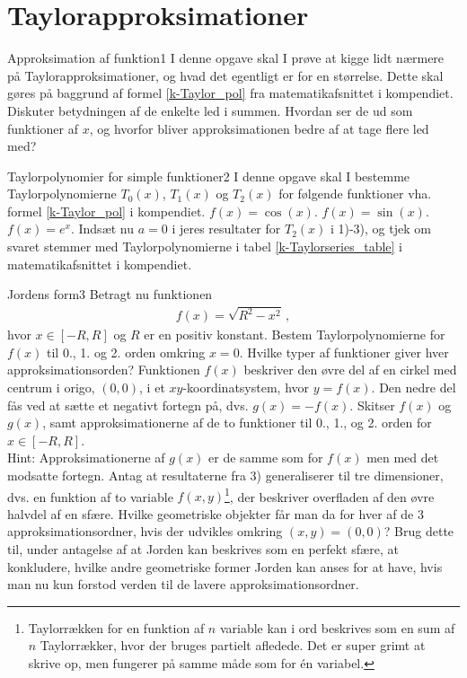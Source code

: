 \section*{Taylorapproksimationer}
\begin{opgave}{Approksimation af funktion}{1}
	I denne opgave skal I prøve at kigge lidt nærmere på Taylorapproksimationer, og hvad det egentligt er for en størrelse. Dette skal gøres på baggrund af formel \eqref{k-Taylor_pol} fra matematikafsnittet i kompendiet.
	\opg Diskuter betydningen af de enkelte led i summen. Hvordan ser de
	ud som funktioner af $x$, og hvorfor bliver approksimationen bedre
	af at tage flere led med?
\end{opgave}	
\begin{opgave}{Taylorpolynomier for simple funktioner}{2}
I denne opgave skal I bestemme Taylorpolynomierne $T_0(x)$, $T_1(x)$ og $T_2(x)$ for følgende funktioner vha. formel \eqref{k-Taylor_pol} i kompendiet.
\opg $f(x) = \cos(x)$.
\opg $f(x) = \sin(x)$.
\opg $f(x) = e^x$.
\opg Indsæt nu $a=0$ i jeres resultater for $T_2(x)$ i 1)-3), og tjek om svaret stemmer med Taylorpolynomierne i tabel \ref{k-Taylorseries_table} i matematikafsnittet i kompendiet. 
\end{opgave}
\begin{opgave}{Jordens form}{3}
Betragt nu funktionen
\begin{align*}
f(x) = \sqrt{R^2 - x^2} \, ,
\end{align*}
hvor $ x \in [-R,R]$ og $R$ er en positiv konstant.
\opg Bestem Taylorpolynomierne for $f(x)$ til 0., 1. og 2. orden omkring $x=0$.
\opg Hvilke typer af funktioner giver hver approksimationsorden?
\opg Funktionen $f(x)$ beskriver den øvre del af en cirkel med centrum i origo, $(0,0)$, i et $xy$-koordinatsystem, hvor $y = f(x)$. Den nedre del fås ved at sætte et negativt fortegn på, dvs. $g(x) = -f(x)$. Skitser $f(x)$ og $g(x)$, samt approksimationerne af de to funktioner til 0., 1., og 2. orden for $x \in [-R,R]$.\\
Hint: Approksimationerne af $g(x)$ er de samme som for $f(x)$ men med det modsatte fortegn. 
\opg Antag at resultaterne fra 3) generaliserer til tre dimensioner, dvs. en funktion af to variable $f(x,y)$\footnote{Taylorrækken for en funktion af $n$ variable kan i ord beskrives som en sum af $n$ Taylorrækker, hvor der bruges partielt afledede. Det er super grimt at skrive op, men fungerer på samme måde som for én variabel.}, der beskriver overfladen af den øvre halvdel af en sfære. Hvilke geometriske objekter får man da for hver af de 3 approksimationsordner, hvis der udvikles omkring $(x,y)=(0,0)$?
\opg Brug dette til, under antagelse af at Jorden kan beskrives som en perfekt sfære, at konkludere, hvilke andre geometriske former Jorden kan anses for at have, hvis man nu kun forstod verden til de lavere approksimationsordner.
\end{opgave}
